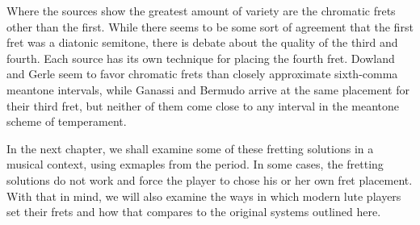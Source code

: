 Where the sources show the greatest amount of variety are the chromatic frets other than the
first.  While there seems to be some sort of agreement that the first fret was a diatonic
semitone, there is debate about the quality of the third and fourth.  Each source has its own
technique for placing the fourth fret.  Dowland and Gerle seem to favor chromatic frets than
closely approximate sixth-comma meantone intervals, while Ganassi and Bermudo arrive at the same
placement for their third fret, but neither of them come close to any interval in the meantone
scheme of temperament.

In the next chapter, we shall examine some of these fretting solutions in a musical context, using
exmaples from the period.  In some cases, the fretting solutions do not work and force the player
to chose his or her own fret placement.  With that in mind, we will also examine the ways in which
modern lute players set their frets and how that compares to the original systems outlined here.

